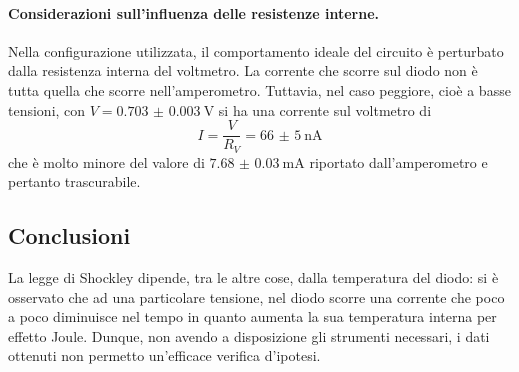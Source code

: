 \documentclass[a4paper]{article}
\begin{document}
\paragraph{Considerazioni sull'influenza delle resistenze interne.} Nella configurazione utilizzata, il comportamento ideale del circuito è perturbato dalla resistenza interna del voltmetro. La corrente che scorre sul diodo non è tutta quella che scorre nell'amperometro. Tuttavia, nel caso peggiore, cioè a basse tensioni, con $V=\SI{0.703(3)}{\V}$ si ha una corrente sul voltmetro di
\[
I=\frac{V}{R_V}=\SI{66(5)}{\nano\A}
\] 
che è molto minore del valore di $\SI{7.68(3)}{\mA}$ riportato dall'amperometro e pertanto trascurabile.

\subsection{Conclusioni}
La legge di Shockley dipende, tra le altre cose, dalla temperatura del diodo: si è osservato che ad una particolare tensione, nel diodo scorre una corrente che poco a poco diminuisce nel tempo in quanto aumenta la sua temperatura interna per effetto Joule. Dunque, non avendo a disposizione gli strumenti necessari, i dati ottenuti non permetto un'efficace verifica d'ipotesi.
\end{document}
